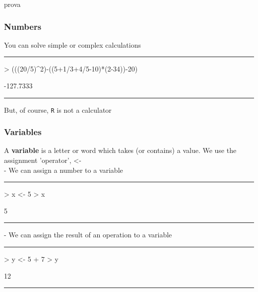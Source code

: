 \documentclass{beamer}
\begin{document}
\begin{frame}[fragile]{prova}
	\frametitle{Numbers}
	You can solve simple or complex calculations 
	\rule{\textwidth}{0.4pt}
\begin{Schunk}
\begin{Sinput}
> (((20/5)^2)-((5+1/3+4/5-10)*(2-34))-20)
\end{Sinput}
\begin{Soutput}
[1] -127.7333
\end{Soutput}
\end{Schunk}
\rule{\textwidth}{0.4pt}
\vspace{20pt}
\Large But, of course, \texttt{R} is not a calculator
\end{frame}

\begin{frame}[fragile]
	\frametitle{Variables}
	A \textbf{variable} is a letter or word which takes (or contains) a value. We use the assignment 'operator', <-\\
	\vspace{10pt}
	- We can assign a number to a variable
	\rule{\textwidth}{0.4pt}
\begin{Schunk}
\begin{Sinput}
> x <- 5
> x
\end{Sinput}
\begin{Soutput}
[1] 5
\end{Soutput}
\end{Schunk}
 \rule{\textwidth}{0.4pt}
 - We can assign the result of an operation to a variable
 \rule{\textwidth}{0.4pt}
\begin{Schunk}
\begin{Sinput}
> y <- 5 + 7
> y
\end{Sinput}
\begin{Soutput}
[1] 12
\end{Soutput}
\end{Schunk}
\rule{\textwidth}{0.4pt}
\end{frame}
\end{document}
